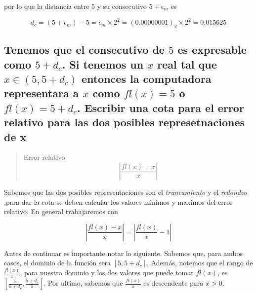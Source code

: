 \documentclass[11pt]{article}
\begin{document}
por lo que la distancia entre \(5\) y su consecutivo \(5+\epsilon_m\) es

\begin{equation*} d_c = (5+\epsilon_m)-5 = \epsilon_m \times 2^2 = (0.00000001)_2 \times 2^2 = 0.015625
\end{equation*}

    \hypertarget{tenemos-que-el-consecutivo-de-5-es-expresable-como-5-d_c.-si-tenemos-un-x-real-tal-que-x-in-5-5d_c-entonces-la-computadora-representara-a-x-como-flx5-o-flx5d_c.-escribir-una-cota-para-el-error-relativo-para-las-dos-posibles-represetnaciones-de-x}{%
\subsection{\texorpdfstring{Tenemos que el consecutivo de \(5\) es
expresable como \(5 + d_c\). Si tenemos un \(x\) real tal que
\(x \in (5, 5+d_c)\) entonces la computadora representara a \(x\) como
\(fl(x)=5\) o \(fl(x)=5+d_c\). Escribir una cota para el error relativo
para las dos posibles represetnaciones de
x}{Tenemos que el consecutivo de 5 es expresable como 5 + d\_c. Si tenemos un x real tal que x \textbackslash{}in (5, 5+d\_c) entonces la computadora representara a x como fl(x)=5 o fl(x)=5+d\_c. Escribir una cota para el error relativo para las dos posibles represetnaciones de x}}\label{tenemos-que-el-consecutivo-de-5-es-expresable-como-5-d_c.-si-tenemos-un-x-real-tal-que-x-in-5-5d_c-entonces-la-computadora-representara-a-x-como-flx5-o-flx5d_c.-escribir-una-cota-para-el-error-relativo-para-las-dos-posibles-represetnaciones-de-x}}

    \begin{quote}
Error relativo \begin{equation*}
\left| \frac{fl(x) - x}{x} \right|
\end{equation*}
\end{quote}

Sabemos que las dos posibles representaciones son el \emph{truncamiento}
y el \emph{redondeo} ,para dar la cota se deben calcular los valores
minimos y maximos del error relativo. En general trabajaremos con

\begin{equation} \label{eq:error relativo}
    \left| \frac{fl(x) - x}{x} \right| = \left| \frac{fl(x)}{x} - 1 \right| 
\end{equation}

Antes de continuar es importante notar lo siguiente. Sabemos que, para
ambos casos, el dominio de la función sera \([5, 5+d_c]\). Además,
notemos que el rango de \(\frac{fl(x)}{x}\), para nuestro dominio y los
dos valores que puede tomar \(fl(x)\), es
\(\left[ \frac{5}{5+d_c}, \frac{5+d_c}{5} \right]\). Por ultimo, sabemos
que \(\frac{fl(x)}{x}\) es descendente para \(x>0\).
\end{document}
